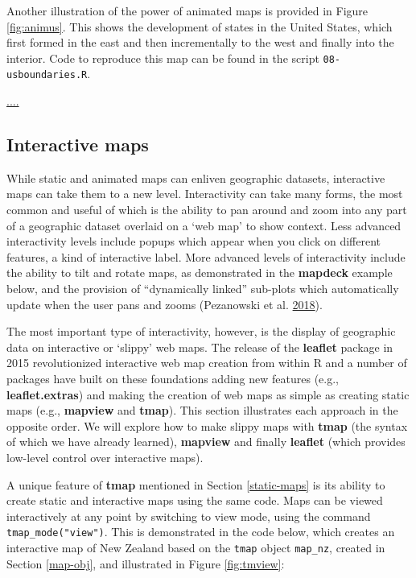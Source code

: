 \documentclass[]{krantz}
\begin{document}
Another illustration of the power of animated maps is provided in Figure \ref{fig:animus}.
This shows the development of states in the United States, which first formed in the east and then incrementally to the west and finally into the interior.
Code to reproduce this map can be found in the script \texttt{08-usboundaries.R}.

\url{....}

\hypertarget{interactive-maps}{%
\subsection{Interactive maps}\label{interactive-maps}}

While static and animated maps can enliven geographic datasets, interactive maps can take them to a new level.
Interactivity can take many forms, the most common and useful of which is the ability to pan around and zoom into any part of a geographic dataset overlaid on a `web map' to show context.
Less advanced interactivity levels include popups which appear when you click on different features, a kind of interactive label.
More advanced levels of interactivity include the ability to tilt and rotate maps, as demonstrated in the \textbf{mapdeck} example below, and the provision of ``dynamically linked'' sub-plots which automatically update when the user pans and zooms (Pezanowski et al. \protect\hyperlink{ref-pezanowski_senseplace3_2018}{2018}).

The most important type of interactivity, however, is the display of geographic data on interactive or `slippy' web maps.
The release of the \textbf{leaflet} package in 2015 revolutionized interactive web map creation from within R and a number of packages have built on these foundations adding new features (e.g., \textbf{leaflet.extras}) and making the creation of web maps as simple as creating static maps (e.g., \textbf{mapview} and \textbf{tmap}).
This section illustrates each approach in the opposite order.
We will explore how to make slippy maps with \textbf{tmap} (the syntax of which we have already learned), \textbf{mapview} and finally \textbf{leaflet} (which provides low-level control over interactive maps).

A unique feature of \textbf{tmap} mentioned in Section \ref{static-maps} is its ability to create static and interactive maps using the same code.
Maps can be viewed interactively at any point by switching to view mode, using the command \texttt{tmap\_mode("view")}.
This is demonstrated in the code below, which creates an interactive map of New Zealand based on the \texttt{tmap} object \texttt{map\_nz}, created in Section \ref{map-obj}, and illustrated in Figure \ref{fig:tmview}:
\end{document}
